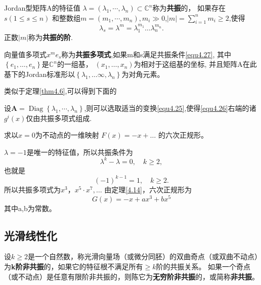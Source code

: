 \begin{defination}
  Jordan型矩阵A的特征值
  $\lambda= \left( \lambda _ { 1 } , \cdots , \lambda _ { n } \right) \subset \mathbb{C} ^ { n }$称为\textbf{共振}的，
  如果存在$s ( 1 \leqslant s \leqslant n )$
  和整数组$m = \left( m _ { 1 } , \cdots , m _ { n } \right) , m _ { i }\gg 0$,$| m | = \sum _ { i = 1 } ^ { n } m _ { i } \geqslant 2$,使得
  \begin{equation}
    \lambda _ { s } = \lambda ^ { m } = \lambda _ { 1 } ^ { m _ { 1 } } \dots \lambda _ { n } ^ { m _n}.
        \label{eq:1.4.27}
  \end{equation}
  正数\(|m|\)称为\textbf{共振的阶}.
\end{defination}

\begin{defination}
  向量值多项式\(x^me_s\)称为\textbf{共振多项式},如果m和s满足共振条件\ref{equ4.27},
  其中$\left\{ e _ { 1 } , \dots , e _ { n } \right\}$是\(\mathbb{C}^n\)的一组基，
  \((x_1,\dots,x_n)\)为相对于这组基的坐标,
  并且矩阵A在此基下的Jordan标准形以$\left\{ \lambda _ { 1 } , \dots \infty , \lambda _ { n } \right\}$为对角元素。
  \label{def:1.4.13}
\end{defination}

类似于定理\ref{thm4.6},可以得到下面的

\begin{theorem}
  设$\boldsymbol { A } = \operatorname { Diag } \left\{ \lambda _ { 1 } , \cdots , \lambda _ { n } \right\}$,则可以选取适当的变换\ref{equ4.25},使得\ref{equ4.26}右端的诸\(g^i(x)\)仅由共振多项式组成.  
\end{theorem}

\begin{example}
  求以\(x=0\)为不动点的一维映射
  \(F(x)=-x+\dots\)
  的六次正规形。
\end{example}

\begin{solve}
  $\lambda = - 1$是唯一的特征值，所以共振条件为
  \[
\lambda ^ { k } - \lambda = 0 , \quad k \geqslant 2,
  \]
  也就是
  \[
( - 1 ) ^ { k - 1 } = 1 , \quad k \geqslant 2.
\]
所以共振多项式为$x ^ { 3 } ， x ^ { 5 } \cdot x ^ { 7 } , \dots$
由定理\ref{4.14}，六次正规形为
\[
G ( x ) = - x + a x ^ { 3 } + b x ^ { 5 }
\]
其中a,b为常数。
\end{solve}

\subsection{光滑线性化}
\begin{defination}
  设\(k \geqslant 2\)是一个自然数，称光滑向量场（或微分同胚）的双曲奇点（或双曲不动点）为\textbf{k阶非共振}的，如果它的特征根不满足所有\(\geqslant k\)阶的共振关系。
  如果一个奇点（或不动点）是任意有限阶非共振的，则陈它为\textbf{无穷阶非共振}的，或简称\textbf{非共振}。
  \label{def:1.4.16}
\end{defination}

